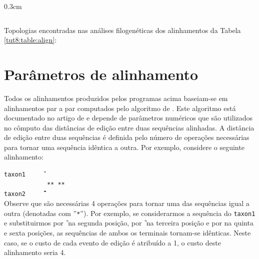 \begin{refsection}
\begin {myindentpar}{0.3cm}
\begin{enumerate}[\itshape i.]
\begin{center}
\begin{longtable}{|c|c|c|}
\end{longtable}
\end{center}

\end{enumerate}
\end{myindentpar}

Topologias encontradas nas análises filogenéticas dos alinhamentos da Tabela \ref{tut8:table:align}:\\


\newpage
\section{Parâmetros de alinhamento}\label{tut8:par}

Todos os alinhamentos produzidos pelos programas acima baseiam-se em alinhamentos par a par computados pelo algoritmo de \textcite{Needleman_and_Wunsch_1970}. Este algoritmo está documentado no artigo de \textcite{Phillips_et_al_2000} e depende de parâmetros numéricos que são utilizados no cômputo das distâncias de edição entre duas sequências alinhadas. A distância de edição entre duas sequências é definida pelo número de operações necessárias para tornar uma sequência idêntica a outra. Por exemplo, considere o seguinte alinhamento:

\indent\indent\indent\indent\indent\indent\indent\texttt{taxon1~~~~~\T\A\T\G\gap\gap\A}\\
\indent\indent\indent\indent\indent\indent\indent\texttt{~~~~~~~~~~~~**~**~}\\
\indent\indent\indent\indent\indent\indent\indent\texttt{taxon2~~~~~\T\G\G\G\C\C\A}\\

Observe que são necessárias 4 operações para tornar uma das sequências igual a outra (denotadas com ''\texttt{*}''). Por exemplo, se considerarmos a sequência do \texttt{taxon1} e substituirmos \texttt{\A} por \texttt{\G} na segunda posição, \texttt{\T} por \texttt{\G} na terceira posição e \texttt{\gap} por \texttt{\C} na quinta e sexta posições, as sequências de ambos os terminais tornam-se idênticas. Neste caso, se o custo de cada evento de edição é atribuído a 1, o custo deste alinhamento seria 4. 


\end{refsection}
